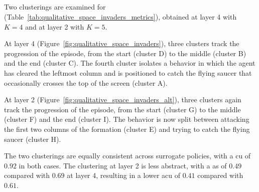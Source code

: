 \newpage
\subsection{\SpaceInvadersName}

Two clusterings are examined for \SpaceInvadersName (Table~\ref{tab:qualitative_space_invaders_metrics}), obtained at layer 4 with $K=4$ and at layer 2 with $K=5$.

At layer 4 (Figure~\ref{fig:qualitative_space_invaders}), three clusters track the progression of the episode, from the start (cluster D) to the middle (cluster B) and the end (cluster C).
The fourth cluster isolates a behavior in which the agent has cleared the leftmost column and is positioned to catch the flying saucer that occasionally crosses the top of the screen (cluster A).

At layer 2 (Figure~\ref{fig:qualitative_space_invaders_alt}), three clusters again track the progression of the episode, from the start (cluster G) to the middle (cluster F) and the end (cluster I).
The behavior is now split between attacking the first two columns of the formation (cluster E) and trying to catch the flying saucer (cluster H).

The two clusterings are equally consistent across surrogate policies, with a \gls{cu} of $0.92$ in both cases.
The clustering at layer 2 is less abstract, with a \gls{as} of $0.49$ compared with $0.69$ at layer 4, resulting in a lower \gls{acu} of $0.41$ compared with $0.61$.

